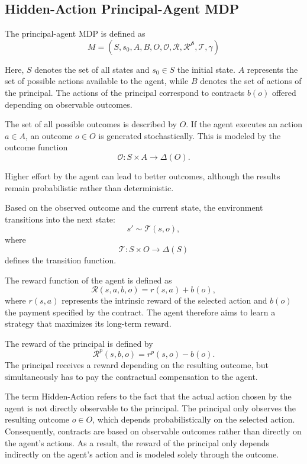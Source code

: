 \documentclass{article}
\theoremstyle{plain}
\theoremstyle{definition}
\theoremstyle{remark}
\begin{document}
\subsection{Hidden-Action Principal-Agent MDP}
\label{subsec:MDP}
The principal-agent MDP is defined as
\begin{equation}
M = (S, s_{0}, A, B, O, \mathcal{O}, \mathcal{R}, \mathcal{R^p}, \mathcal{T}, \gamma)
\end{equation}

Here, $S$ denotes the set of all states and $s_0 \in S$ the initial state. 
$A$ represents the set of possible actions available to the agent, while $B$ denotes the set of actions of the principal. The actions of the principal correspond to contracts $b(o)$ offered depending on observable outcomes.

The set of all possible outcomes is described by $O$. If the agent executes an action $a \in A$, an outcome $o \in O$ is generated stochastically. This is modeled by the outcome function
\[
\mathcal{O}: S \times A \xrightarrow{} \Delta(O).
\]

Higher effort by the agent can lead to better outcomes, although the results remain probabilistic rather than deterministic.

Based on the observed outcome and the current state, the environment transitions into the next state:
\[
s' \sim \mathcal{T}(s,o),
\]
where
\[
\mathcal{T}: S \times O \xrightarrow{} \Delta(S)
\]
defines the transition function.

The reward function of the agent is defined as
\[
\mathcal{R}(s,a,b,o) = r(s,a) + b(o),
\]
where $r(s,a)$ represents the intrinsic reward of the selected action and $b(o)$ the payment specified by the contract. The agent therefore aims to learn a strategy that maximizes its long-term reward.

The reward of the principal is defined by
\[
\mathcal{R}^{p}(s,b,o) = r^p(s,o) - b(o).
\]
The principal receives a reward depending on the resulting outcome, but simultaneously has to pay the contractual compensation to the agent.

The term Hidden-Action refers to the fact that the actual action chosen by the agent is not directly observable to the principal. The principal only observes the resulting outcome $o \in O$, which depends probabilistically on the selected action. Consequently, contracts are based on observable outcomes rather than directly on the agent's actions. As a result, the reward of the principal only depends indirectly on the agent's action and is modeled solely through the outcome.
\end{document}
